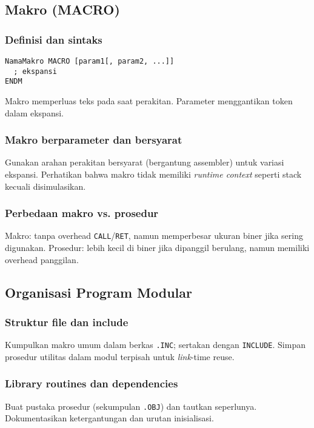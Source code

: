 \subsection{Makro (MACRO)}
\subsubsection{Definisi dan sintaks}
\begin{verbatim}
NamaMakro MACRO [param1[, param2, ...]]
  ; ekspansi
ENDM
\end{verbatim}
Makro memperluas teks pada saat perakitan. Parameter menggantikan token dalam ekspansi.

\subsubsection{Makro berparameter dan bersyarat}
Gunakan arahan perakitan bersyarat (bergantung assembler) untuk variasi ekspansi. Perhatikan bahwa makro tidak memiliki \textit{runtime context} seperti stack kecuali disimulasikan.

\subsubsection{Perbedaan makro vs. prosedur}
Makro: tanpa overhead \texttt{CALL}/\texttt{RET}, namun memperbesar ukuran biner jika sering digunakan. Prosedur: lebih kecil di biner jika dipanggil berulang, namun memiliki overhead panggilan.

\subsection{Organisasi Program Modular}
\subsubsection{Struktur file dan include}
Kumpulkan makro umum dalam berkas \texttt{.INC}; sertakan dengan \texttt{INCLUDE}. Simpan prosedur utilitas dalam modul terpisah untuk \textit{link}-time reuse.

\subsubsection{Library routines dan dependencies}
Buat pustaka prosedur (sekumpulan \texttt{.OBJ}) dan tautkan seperlunya. Dokumentasikan ketergantungan dan urutan inisialisasi.

